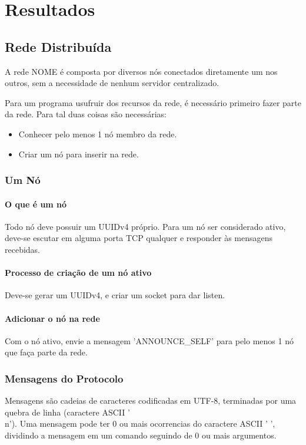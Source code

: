 \chapter{Resultados}
\label{sec:resultados}

\section{Rede Distribuída}
\label{sec:resultados:rede}

  A rede NOME é composta por diversos nós conectados diretamente um nos outros, sem a necessidade de nenhum servidor centralizado.
  
  Para um programa usufruir dos recursos da rede, é necessário primeiro fazer parte da rede. Para tal duas coisas são necessárias:
  \begin{itemize}
    \item Conhecer pelo menos 1 nó membro da rede.
    \item Criar um nó para inserir na rede.
  \end{itemize}
  
  \subsection{Um Nó}
    \subsubsection{O que é um nó}
      Todo nó deve possuir um UUIDv4 próprio.
      Para um nó ser considerado ativo, deve-se escutar em alguma porta TCP qualquer e responder às mensagens recebidas.
      
    \subsubsection{Processo de criação de um nó ativo}
      Deve-se gerar um UUIDv4, e criar um socket para dar listen.

    \subsubsection{Adicionar o nó na rede}
      Com o nó ativo, envie a mensagem 'ANNOUNCE\_SELF' para pelo menos 1 nó que faça parte da rede.

  \subsection{Mensagens do Protocolo}
    Mensagens são cadeias de caracteres codificadas em UTF-8, terminadas por uma quebra de linha
    (caractere ASCII '\\n'). Uma mensagem pode ter 0 ou mais ocorrencias do caractere ASCII ' ',
    dividindo a mensagem em um comando seguindo de 0 ou mais argumentos.
    
